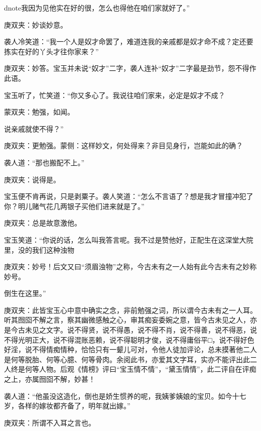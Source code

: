 \begin{parag}
d{note}我因为见他实在好的很，怎么也得他在咱们家就好了。”\begin{note}庚双夹：妙谈妙意。\end{note}袭人冷笑道：“我一个人是奴才命罢了，难道连我的亲戚都是奴才命不成？定还要拣实在好的丫头才往你家来？”\begin{note}庚双夹：妙答。宝玉并未说“奴才”二字，袭人连补“奴才”二字最是劲节，怨不得作此语。\end{note}宝玉听了，忙笑道：“你又多心了。我说往咱们家来，必定是奴才不成？\begin{note}蒙双夹：勉强，如闻。\end{note}说亲戚就使不得？”\begin{note}庚双夹：更勉强。蒙侧：这样妙文，何处得来？非目见身行，岂能如此的确？\end{note}袭人道：“那也搬配不上。”\begin{note}庚双夹：说得是。\end{note}宝玉便不肯再说，只是剥粟子。袭人笑道：“怎么不言语了？想是我才冒撞冲犯了你？明儿赌气花几两银子买他们进来就是了。”\begin{note}庚双夹：总是故意激他。\end{note}宝玉笑道：“你说的话，怎么叫我答言呢。我不过是赞他好，正配生在这深堂大院里，没的我们这种浊物\begin{note}庚双夹：妙号！后文又曰“须眉浊物”之称，今古未有之一人始有此今古未有之妙称妙号。\end{note}倒生在这里。”\begin{note}庚双夹：此皆宝玉心中意中确实之念，非前勉强之词，所以谓今古未有之一人耳。听其囫囵不解之言，察其幽微感触之心，审其痴妄委婉之意，皆今古未见之人，亦是今古未见之文字。说不得贤，说不得愚，说不得不肖，说不得善，说不得恶，说不得光明正大，说不得混账恶赖，说不得聪明才俊，说不得庸俗平□，说不得好色好淫，说不得情痴情种，恰恰只有一颦儿可对，令他人徒加评论，总未摸著他二人是何等脱胎、何等心臆、何等骨肉。余阅此书，亦爱其文字耳，实亦不能评出此二人终是何等人物。后观《情榜》评曰“宝玉情不情”，“黛玉情情”，此二评自在评痴之上，亦属囫囵不解，妙甚！\end{note}袭人道：“他虽没这造化，倒也是娇生惯养的呢，我姨爹姨娘的宝贝。如今十七岁，各样的嫁妆都齐备了，明年就出嫁。”\begin{note}庚双夹：所谓不入耳之言也。\end{note}
\end{parag}



